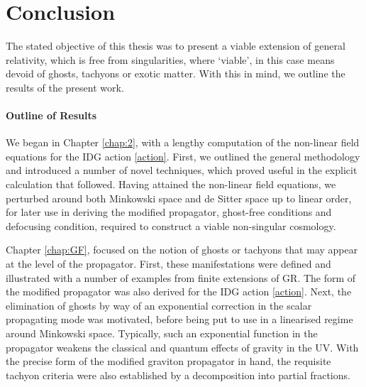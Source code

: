 \chapter{Conclusion}
The stated objective of this thesis was to present a viable extension of general relativity, which is free from singularities, where `viable', in this case means devoid of ghosts, tachyons or exotic matter. With this in mind, we outline the results of the present work.
\subsubsection*{Outline of Results}
We began in Chapter \ref{chap:2}, with a lengthy computation of the non-linear field equations for the IDG action \eqref{action}. First, we outlined the general methodology and introduced a number of novel techniques, which proved useful in the explicit calculation that followed. Having attained the non-linear field equations, we perturbed around both Minkowski space and de Sitter space  up to linear order, for later use in deriving the modified propagator, ghost-free conditions and defocusing condition, required to construct a viable non-singular cosmology.

Chapter \ref{chap:GF}, focused on the notion of ghosts or tachyons that may appear at the level of the propagator. First, these manifestations were defined and illustrated with a number of examples from finite extensions of GR. The form of the modified propagator was also derived for the IDG action \eqref{action}. Next, the elimination of ghosts by way of an exponential correction in the scalar propagating mode was motivated, before being put to use in a linearised regime around Minkowski space. Typically, such an exponential function in the propagator weakens the classical and quantum effects of gravity in the UV. 
With the precise form of the modified graviton propagator in hand, the requisite tachyon criteria were also established by a decomposition into partial fractions.

